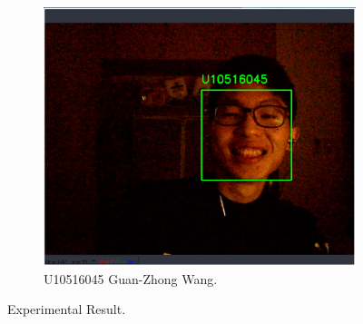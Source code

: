 \begin{figure}[h!]
\begin{subfigure}[b]{0.32\linewidth}
    \includegraphics[width=\linewidth]{figures/exp45.eps}
    \caption{U10516045 Guan-Zhong Wang.}
  \end{subfigure}
  \caption{Experimental Result.}
  \label{fig:coffee}
\end{figure}
